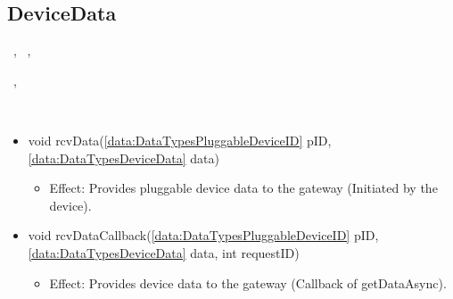   \subsection{DeviceData}\label{int:GatewayGatewayDeviceManagerDeviceData}
    \begin{description}
      \item[Provided by:] \iconcomponent{}~, \iconcomponent{}~, \iconcomponent{}~
      \item[Required by:] \iconcomponent{}~, \iconcomponent{}~
      \item[Operations:] ~
    \begin{itemize}[noitemsep,nolistsep,leftmargin=-.25cm]
      \item \textsf{void rcvData(\ref{data:DataTypesPluggableDeviceID} pID, \ref{data:DataTypesDeviceData} data)}
        \begin{itemize}[noitemsep,nolistsep]
           \item Effect: Provides pluggable device data to the gateway (Initiated by the device).
        \end{itemize}
      \item \textsf{void rcvDataCallback(\ref{data:DataTypesPluggableDeviceID} pID, \ref{data:DataTypesDeviceData} data, int requestID)}
        \begin{itemize}[noitemsep,nolistsep]
           \item Effect: Provides device data to the gateway (Callback of getDataAsync).
        \end{itemize}
    \end{itemize}
    \end{description}


